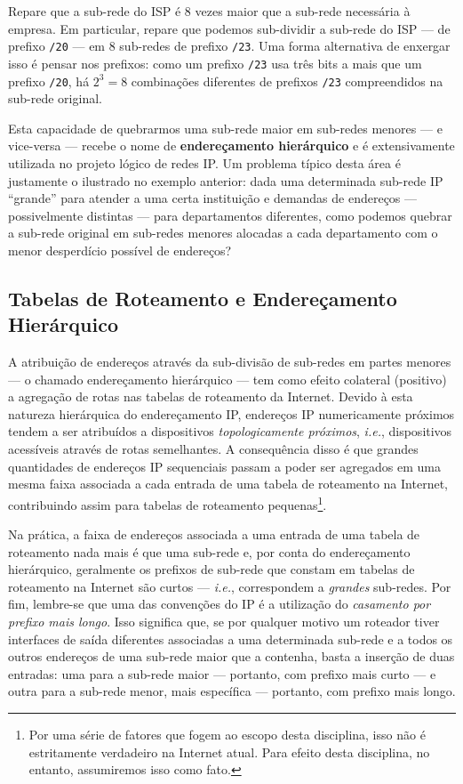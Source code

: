 \documentclass{article}
\begin{document}
Repare que a sub-rede do ISP é 8 vezes maior que a sub-rede necessária à empresa. Em particular, repare que podemos sub-dividir a sub-rede do ISP --- de prefixo \texttt{/20} --- em 8 sub-redes de prefixo \texttt{/23}. Uma forma alternativa de enxergar isso é pensar nos prefixos: como um prefixo \texttt{/23} usa três bits a mais que um prefixo \texttt{/20}, há $2^3 = 8$ combinações diferentes de prefixos \texttt{/23} compreendidos na sub-rede original.

Esta capacidade de quebrarmos uma sub-rede maior em sub-redes menores --- e vice-versa --- recebe o nome de \textbf{endereçamento hierárquico} e é extensivamente utilizada no projeto lógico de redes IP. Um problema típico desta área é justamente o ilustrado no exemplo anterior: dada uma determinada sub-rede IP ``grande'' para atender a uma certa instituição e demandas de endereços --- possivelmente distintas --- para departamentos diferentes, como podemos quebrar a sub-rede original em sub-redes menores alocadas a cada departamento com o menor desperdício possível de endereços?

\subsection{Tabelas de Roteamento e Endereçamento Hierárquico}

A atribuição de endereços através da sub-divisão de sub-redes em partes menores --- o chamado endereçamento hierárquico --- tem como efeito colateral (positivo) a agregação de rotas nas tabelas de roteamento da Internet. Devido à esta natureza hierárquica do endereçamento IP, endereços IP numericamente próximos tendem a ser atribuídos a dispositivos \textit{topologicamente próximos}, \textit{i.e.}, dispositivos acessíveis através de rotas semelhantes. A consequência disso é que grandes quantidades de endereços IP sequenciais passam a poder ser agregados em uma mesma faixa associada a cada entrada de uma tabela de roteamento na Internet, contribuindo assim para tabelas de roteamento pequenas\footnote{Por uma série de fatores que fogem ao escopo desta disciplina, isso não é estritamente verdadeiro na Internet atual. Para efeito desta disciplina, no entanto, assumiremos isso como fato.}.

Na prática, a faixa de endereços associada a uma entrada de uma tabela de roteamento nada mais é que uma sub-rede e, por conta do endereçamento hierárquico, geralmente os prefixos de sub-rede que constam em tabelas de roteamento na Internet são curtos --- \textit{i.e.}, correspondem a \textit{grandes} sub-redes. Por fim, lembre-se que uma das convenções do IP é a utilização do \textit{casamento por prefixo mais longo}. Isso significa que, se por qualquer motivo um roteador tiver interfaces de saída diferentes associadas a uma determinada sub-rede e a todos os outros endereços de uma sub-rede maior que a contenha, basta a inserção de duas entradas: uma para a sub-rede maior --- portanto, com prefixo mais curto --- e outra para a sub-rede menor, mais específica --- portanto, com prefixo mais longo.
\end{document}
